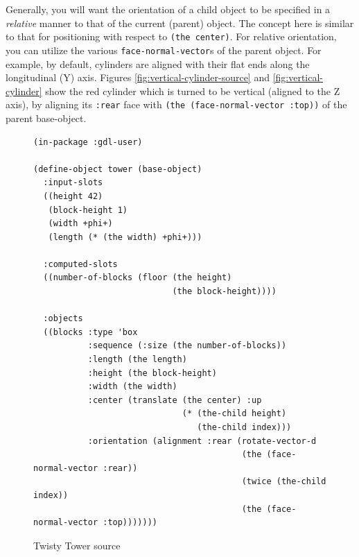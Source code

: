 \documentclass [11pt]{book}
\begin{document}
Generally, you will want the orientation of a child object to be 
specified in a \emph{relative} manner to that of the current (parent) object. The concept here is 
similar to that for positioning with respect to \texttt{(the center)}. For relative orientation, you can utilize the various \texttt{face-normal-vector}s of the parent object. For example, by default, cylinders are aligned with 
their flat ends along the longitudinal (Y) axis. Figures 
\ref{fig:vertical-cylinder-source} and 
\ref{fig:vertical-cylinder} show the red cylinder which is turned to be
	 vertical (aligned to the Z axis), by aligning its \texttt{:rear} face with \texttt{(the (face-normal-vector :top))} of the parent base-object.

\begin{figure}\begin{lrbox}{\boxedverb}
\begin{minipage}{\linewidth}\begin{verbatim}(in-package :gdl-user)

(define-object tower (base-object)
  :input-slots 
  ((height 42)
   (block-height 1)
   (width +phi+)
   (length (* (the width) +phi+)))

  :computed-slots
  ((number-of-blocks (floor (the height)
                            (the block-height))))

  :objects
  ((blocks :type 'box
           :sequence (:size (the number-of-blocks))
           :length (the length)
           :height (the block-height)
           :width (the width)
           :center (translate (the center) :up 
                              (* (the-child height)
                                 (the-child index)))
           :orientation (alignment :rear (rotate-vector-d 
                                          (the (face-normal-vector :rear))
                                          (twice (the-child index))
                                          (the (face-normal-vector :top)))))))

\end{verbatim}\end{minipage}
\end{lrbox}
\fbox{\usebox{\boxedverb}}

\caption{Twisty Tower  source}

\label{fig:tower-source}

\end{figure}
\end{document}

